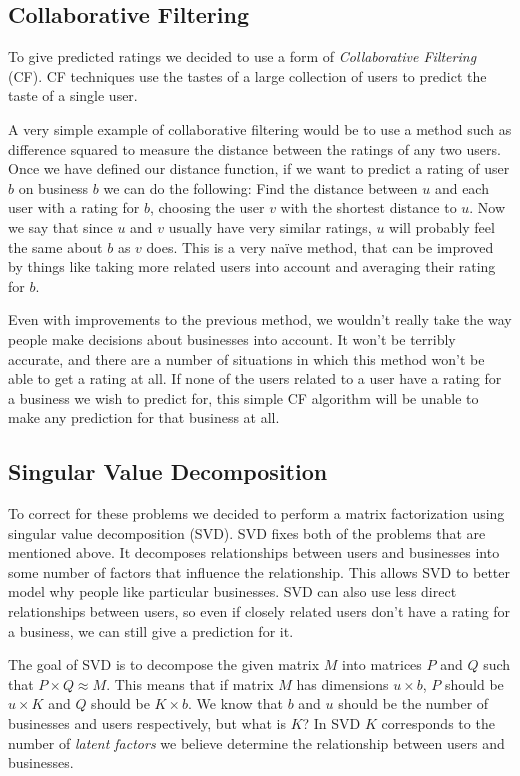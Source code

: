 \subsection{Collaborative Filtering}

To give predicted ratings we decided to use a form of \emph{Collaborative
Filtering} (CF). CF techniques use the tastes of a large collection of users to
predict the taste of a single user.

A very simple example of collaborative filtering would be to use a method such
as difference squared to measure the distance between the ratings of any two
users. Once we have defined our distance function, if we want to predict a
rating of user $b$ on business $b$ we can do the following: Find the distance
between $u$ and each user with a rating for $b$, choosing the user $v$ with the
shortest distance to $u$. Now we say that since $u$ and $v$ usually have very
similar ratings, $u$ will probably feel the same about $b$ as $v$ does. This is
a very na\"{i}ve method, that can be improved by things like taking more related
users into account and averaging their rating for $b$.

Even with improvements to the previous method, we wouldn't really take the way
people make decisions about businesses into account. It won't be terribly
accurate, and there are a number of situations in which this method won't be
able to get a rating at all. If none of the users related to a user have a
rating for a business we wish to predict for, this simple CF algorithm will be
unable to make any prediction for that business at all. 

\subsection{Singular Value Decomposition}
To correct for these problems we decided to perform a matrix factorization
using singular value decomposition (SVD)\cite{bellkor}. SVD fixes both of the
problems that are mentioned above. It decomposes relationships between users
and businesses into some number of factors that influence the relationship.
This allows SVD to better model why people like particular businesses.
SVD can also use less direct relationships between users, so even if
closely related users don't have a rating for a business, we can still give a
prediction for it.

The goal of SVD is to decompose the given matrix $M$ into
matrices $P$ and $Q$ such that $P \times Q \approx M $. This means that if
matrix $M$ has dimensions $u \times b$, $P$ should be $u \times K$ and $Q$
should be $K \times b$. We know that $b$ and $u$ should be the number of
businesses and users respectively, but what is $K$? In SVD $K$ corresponds to
the number of \emph{latent factors} we believe determine the relationship
between users and businesses.

